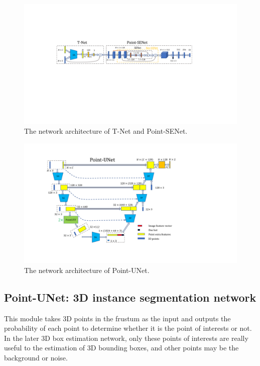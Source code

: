 \documentclass[letterpaper]{article} %
\begin{document}
\begin{figure}[htp]
\begin{center}
  \includegraphics[width=0.95\linewidth]{t-NET_3dBOX_Ok.pdf}
\end{center}
\caption{The network architecture of T-Net and Point-SENet.}
\end{figure}

\begin{figure}[t]
\begin{center}
  \includegraphics[width=0.95\linewidth]{3D_UNET_ok.pdf}
\caption{The network architecture of Point-UNet.}
\end{center}
\end{figure}

\subsection{Point-UNet: 3D instance segmentation network}
This module takes 3D points in the frustum as the input and outputs the probability of each point to determine whether it is the point of interests or not. In the later 3D box estimation network, only these points of interests are really useful to the estimation of 3D bounding boxes, and other points may be the background or noise.
\end{document}
